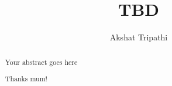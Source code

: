 \documentclass[a4paper, twoside]{report}
\title{TBD}
\author{Akshat Tripathi}
\begin{document}


\begin{abstract}
Your abstract goes here
\end{abstract}

\renewcommand{\abstractname}{Acknowledgements}
\begin{abstract}
Thanks mum!
\end{abstract}

\tableofcontents
\listoffigures
\listoftables











\end{document}
